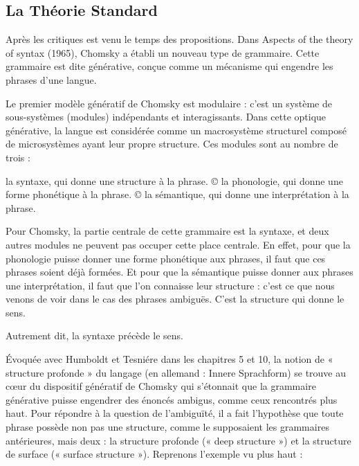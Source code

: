 \subsection{La Théorie Standard}
Après les critiques est venu le temps des propositions. Dans Aspects of the theory of syntax (1965), Chomsky a établi un nouveau type de grammaire. Cette grammaire est dite générative, conçue comme un mécanisme qui engendre les phrases d’une langue.\par

Le premier modèle génératif de Chomsky est modulaire : c’est un système de sous-systèmes (modules) indépendants et interagissants. Dans cette optique générative, la langue est considérée comme un macrosystème structurel composé de microsystèmes ayant leur propre structure. Ces modules sont au nombre de trois :\par

la syntaxe, qui donne une structure à la phrase. © la phonologie, qui donne une forme phonétique à la phrase. © la sémantique, qui donne une interprétation à la phrase.\par

Pour Chomsky, la partie centrale de cette grammaire est la syntaxe, et deux autres modules ne peuvent pas occuper cette place centrale. En effet, pour que la phonologie puisse donner une forme phonétique aux phrases, il faut que ces phrases soient déjà formées. Et pour que la sémantique puisse donner aux phrases une interprétation, il faut que l’on connaisse leur structure : c’est ce que nous venons de voir dans le cas des phrases ambiguës. C’est la structure qui donne le sens.\par




Autrement dit, la syntaxe précède le sens.\par


Évoquée avec Humboldt et Tesniére dans les chapitres 5 et 10, la notion de « structure profonde » du langage (en allemand : Innere Sprachform) se trouve au cœur du dispositif génératif de Chomsky qui s’étonnait que la grammaire générative puisse engendrer des énoncés ambigus, comme ceux rencontrés plus haut. Pour répondre à la question de l’ambiguïté, il a fait l'hypothèse que toute phrase possède non pas une structure, comme le supposaient les grammaires antérieures, mais deux : la structure profonde (« deep structure ») et la structure de surface (« surface structure »). Reprenons l’exemple vu plus haut :\par

